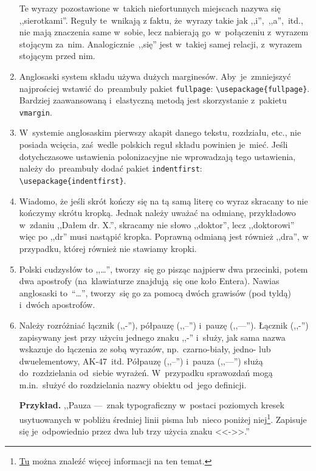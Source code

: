 \documentclass[a4paper,11pt]{article}
\newcommand{\tbs}{\textbackslash}  %
\begin{document}
\begin{enumerate}
  Te wyrazy pozostawione w~takich niefortunnych miejscach nazywa się
  ,,sierotkami''. Reguły te~wnikają z faktu, że~wyrazy takie jak
  ,,i'',~,,a'',~itd., nie mają znaczenia same w~sobie, lecz nabierają
  go~w~połączeniu z~wyrazem stojącym za~nim. Analogicznie~,,się'' jest
  w~takiej samej relacji, z~wyrazem stojącym przed nim.
\item Anglosaski system składu używa dużych marginesów.
  Aby~je~zmniejszyć najprościej wstawić do~preambuły pakiet
  \texttt{fullpage}: \texttt{\tbs usepackage\{fullpage\}}. Bardziej
  zaawansowaną i~elastyczną metodą jest skorzystanie z~pakietu
  \texttt{vmargin}.
\item W~systemie anglosaskim pierwszy akapit danego tekstu, rozdziału,
  etc., nie posiada wcięcia, zaś~wedle polskich reguł składu powinien
  je~mieć. Jeśli dotychczasowe ustawienia polonizacyjne nie
  wprowadzają tego ustawienia, należy do~preambuły dodać pakiet
  \texttt{indentfirst}: \texttt{\tbs usepackage\{indentfirst\}}.
\item Wiadomo, że jeśli skrót kończy się na tą samą literę co wyraz
  skracany to nie kończymy skrótu kropką. Jednak należy uważać na
  odmianę, przykładowo w~zdaniu ,,Dałem dr. X.'', skracamy nie słowo
  ,,doktor'', lecz ,,doktorowi'' więc po ,,dr'' musi nastąpić kropka.
  Poprawną odmianą jest również ,,dra'', w przypadku, której również
  nie stawiamy kropki.
\item Polski cudzysłów to ,,\ldots'', tworzy~się go pisząc najpierw
  dwa przecinki, potem dwa apostrofy (na~klawiaturze znajdują~się one
  koło Entera). Nawias anglosaski to~``\ldots'', tworzy~się go za
  pomocą dwóch grawisów (pod tyldą) i~dwóch apostrofów.
\item Należy rozróżniać łącznik (,,-''), półpauzę (,,--'') i~pauzę
  (,,---''). Łącznik (,,-'') zapisywany jest przy użyciu jednego znaku
  ,,-'' i~służy, jak sama nazwa wskazuje do łączenia ze sobą wyrazów,
  np.~czarno-biały, jedno- lub dwuelementowy, AK-47~itd. Półpauzę
  (,,--'') i~pauza (,,---'') służą do~rozdzielania od~siebie wyrażeń.
  W~przypadku sprawozdań mogą m.in.~służyć do rozdzielania nazwy
  obiektu od~jego definicji.

  \textbf{Przykład.} ,,Pauza ---~znak typograficzny w~postaci
  poziomych kresek usytuowanych w pobliżu średniej linii pisma
  lub~nieco poniżej
  niej\footnote{\href{https://pl.wikipedia.org/wiki/Pauza_(znak_typograficzny)}{Tu}
    można znaleźć więcej informacji na ten temat.}. Zapisuje się
  je~odpowiednio przez dwa lub trzy użycia znaku <<->>.''


\end{enumerate}
\end{document}
